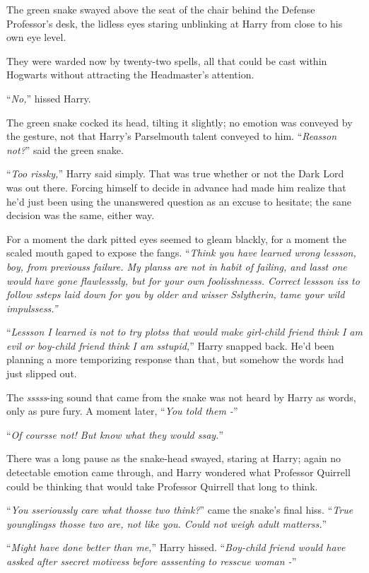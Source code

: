 The green snake swayed above the seat of the chair behind the Defense Professor's desk, the lidless eyes staring unblinking at Harry from close to his own eye level.

They were warded now by twenty-two spells, all that could be cast within Hogwarts without attracting the Headmaster's attention.

``\emph{No,}'' hissed Harry.

The green snake cocked its head, tilting it slightly; no emotion was conveyed by the gesture, not that Harry's Parselmouth talent conveyed to him. ``\emph{Reasson not?}'' said the green snake.

``\emph{Too rissky,}'' Harry said simply. That was true whether or not the Dark Lord was out there. Forcing himself to decide in advance had made him realize that he'd just been using the unanswered question as an excuse to hesitate; the sane decision was the same, either way.

For a moment the dark pitted eyes seemed to gleam blackly, for a moment the scaled mouth gaped to expose the fangs. ``\emph{Think you have learned wrong lessson, boy, from previouss failure. My planss are not in habit of failing, and lasst one would have gone flawlesssly, but for your own foolisshnesss. Correct lessson iss to follow ssteps laid down for you by older and wisser Sslytherin, tame your wild impulssess.''}

``\emph{Lessson I learned is not to try plotss that would make girl-child friend think I am evil or boy-child friend think I am sstupid,}'' Harry snapped back. He'd been planning a more temporizing response than that, but somehow the words had just slipped out.

The \emph{sssss}-ing sound that came from the snake was not heard by Harry as words, only as pure fury. A moment later, ``\emph{You told them -}''

``\emph{Of coursse not! But know what they would ssay.}''

There was a long pause as the snake-head swayed, staring at Harry; again no detectable emotion came through, and Harry wondered what Professor Quirrell could be thinking that would take Professor Quirrell that long to think.

``\emph{You sserioussly care what thosse two think?}'' came the snake's final hiss. ``\emph{True younglingss thosse two are, not like you. Could not weigh adult matterss.}''

``\emph{Might have done better than me,}'' Harry hissed. ``\emph{Boy-child friend would have assked after ssecret motivess before asssenting to resscue woman -}''

